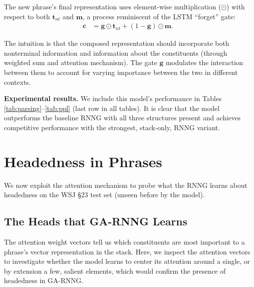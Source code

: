\documentclass[11pt]{article}
\newcommand{\ignore}[1]{}
\newcommand{\ask}[1]{\textcolor{orange}{{\textbf{[#1 --\textsc{ask}]}}}}
\newcommand{\cjd}[1]{\textcolor{cyan}{{\textbf{[#1 --\textsc{cjd}]}}}}
\newcommand{\nascomment}[1]{\textcolor{blue}{{\textbf{[#1 --\textsc{nas}]}}}}
\renewcommand{\ask}[1]{}
\renewcommand{\cjd}[1]{}
\renewcommand{\nascomment}[1]{}
\begin{document}
The new phrase's final representation uses element-wise multiplication ($\odot$) with respect to both $\mathbf{t}_{\mathit{nt}}$ and $\mathbf{m}$, a process reminiscent of the LSTM ``forget'' gate:
\begin{align}
\mathbf{c} &= \mathbf{g} \odot \mathbf{t}_{\mathit{nt}} + \left( 1 -  \mathbf{g}\right) \odot \mathbf{m}.
\end{align}

The intuition is that the composed representation should incorporate both nonterminal information and information about the constituents (through weighted sum and attention mechanism). The gate $\mathbf{g}$ modulates the interaction between them to account for varying importance between the two in different contexts.  \ignore{\ask{add figure here. Or not, if the equations and intuitions are clear enough; I tried making it as clear as possible since some reviewers may not be familiar with attention (mostly used in MT). Any thoughts?}. \nascomment{I don't think we need a figure.  I tried to make it even cleaner; please check carefully.  I got rid of some symbols.}}



\textbf{Experimental results.} We include this model's performance in Tables \ref{tab:parsing}--\ref{tab:ppl} (last row in all tables). It is clear that the model outperforms the baseline RNNG with all three structures present and achieves competitive performance with the strongest, stack-only, RNNG variant.


\section{Headedness in Phrases}\label{sec:headedness}
We now exploit the attention mechanism to probe what the RNNG learns about headedness on the WSJ \S 23 test set (unseen before by the model).
\subsection{The Heads that GA-RNNG Learns}\label{sec:heads_GA_RNNG}

\nascomment{need to figure out -- perplexity or entropy?}\cjd{strongly in favor of ppl}

The attention weight vectors tell us which constituents are most important to a phrase's vector representation in the stack.  Here, we inspect the attention vectors to investigate whether the model learns to center its attention around a single, or by extension a few, salient elements, which would confirm the presence of headedness in GA-RNNG.
\end{document}
